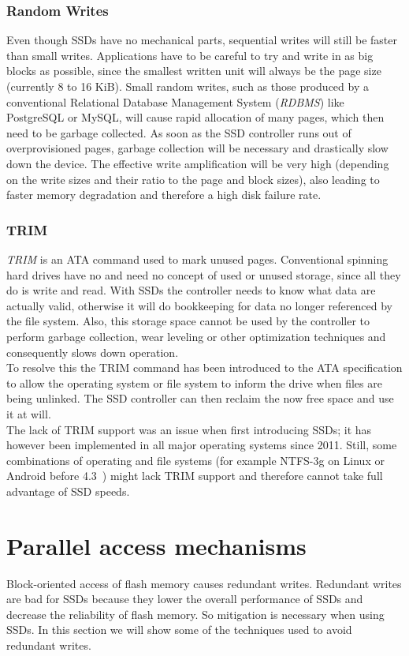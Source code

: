 \documentclass{acm_proc_article-sp}
\begin{document}
\subsubsection*{Random Writes}
Even though SSDs have no mechanical parts, sequential writes will still be faster than small writes. Applications have to be careful to try and write in as big blocks as possible, since the smallest written unit will always be the page size (currently 8 to 16 KiB). Small random writes, such as those produced by a conventional Relational Database Management System (\emph{RDBMS}) like PostgreSQL or MySQL, will cause rapid allocation of many pages, which then need to be garbage collected. As soon as the SSD controller runs out of overprovisioned pages, garbage collection will be necessary and drastically slow down the device. The effective write amplification will be very high (depending on the write sizes and their ratio to the page and block sizes), also leading to faster memory degradation and therefore a high disk failure rate.

\subsubsection*{TRIM}
\emph{TRIM} is an ATA command used to mark unused pages. Conventional spinning hard drives have no and need no concept of used or unused storage, since all they do is write and read. With SSDs the controller needs to know what data are actually valid, otherwise it will do bookkeeping for data no longer referenced by the file system. Also, this storage space cannot be used by the controller to perform garbage collection, wear leveling or other optimization techniques and consequently slows down operation.
\\
To resolve this the TRIM command has been introduced to the ATA specification to allow the operating system or file system to inform the drive when files are being unlinked. The SSD controller can then reclaim the now free space and use it at will.
\\
The lack of TRIM support was an issue when first introducing SSDs; it has however been implemented in all major operating systems since 2011. Still, some combinations of operating and file systems (for example NTFS-3g on Linux or Android before 4.3~\cite{androidtrim}) might lack TRIM support and therefore cannot take full advantage of SSD speeds.

\section{Parallel access mechanisms}
Block-oriented access of flash memory causes re\-dundant wri\-tes. Redundant writes are bad for SSDs because they lower the overall performance of SSDs and decrease the reliability of flash memory. So mitigation is necessary when using SSDs. In this section we will show some of the techniques used to avoid redundant writes.
\end{document}
